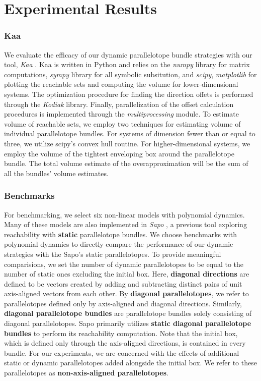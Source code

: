 \chapter{Experimental Results}
\subsection{Kaa}
\label{sec:kaa}
We evaluate the efficacy of our dynamic parallelotope bundle strategies with our tool, \emph{Kaa} \cite{kim2020kaa}. Kaa is written in Python and relies on the \emph{numpy} library for matrix computations, \emph{sympy} library for all symbolic subsitution, and \emph{scipy}, \emph{matplotlib} for plotting the reachable sets and computing the volume for lower-dimensional systems. The optimization procedure for finding the direction offets is performed through the \emph{Kodiak} library. Finally, parallelization of the offset calculation procedures is implemented through the \emph{multiprocessing} module. To estimate volume of reachable sets, we employ two techniques for estimating volume of individual parallelotope bundles. For systems of dimension fewer than or equal to three, we utilize scipy's convex hull routine.
%
For higher-dimensional systems, we employ the volume of the tightest enveloping box around the parallelotope bundle.
%
The total volume estimate of the overapproximation will be the sum of all the bundles' volume estimates.
\subsection{Benchmarks}
\label{sec:benchmarks}
For benchmarking, we select six non-linear models with polynomial dynamics.
%
Many of these models are also implemented in \emph{Sapo} \cite{dreossi2017sapo}, a previous tool exploring reachability with {\bf static} parallelotope bundles.
%
We choose benchmarks with polynomial dynamics to directly compare the performance of our dynamic strategies with the Sapo's static parallelotopes. To provide meaningful comparisions, we set the number of dynamic parallelotopes to be equal to the number of static ones excluding the initial box. Here, {\bf diagonal directions} are defined to be vectors created by adding and subtracting distinct pairs of unit axis-aligned vectors from each other.
%
By {\bf diagonal parallelotopes}, we refer to parallelotopes defined only by axis-aligned and diagonal directions. Similarly, {\bf diagonal parallelotope bundles} are parallelotope bundles solely consisting of diagonal parallelotopes. Sapo primarily utilizes {\bf static diagonal parallelotope bundles} to perform its reachability computation.
Note that the initial box, which is defined only through the axis-aligned directions, is contained in every bundle.
%
For our experiments, we are concerned with the effects of additional static or dynamic parallelotopes added alongside the initial box. We refer to these parallelotopes as {\bf non-axis-aligned parallelotopes}.

